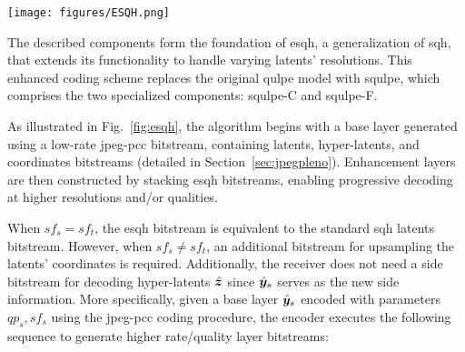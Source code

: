 \begin{figure*}
    \texttt{[image: figures/ESQH.png]}
    \caption{Scalable Resolution and Quality Hyperprior coding scheme. In red are the blocks that are relative to the encoding of the coordinates.}
    \label{fig:esqh}
\end{figure*}
The described components form the foundation of \gls{esqh}, a generalization of \gls{sqh}, that extends its functionality to handle varying latents' resolutions. This enhanced coding scheme replaces the original \gls{qulpe} model with \gls{squlpe}, which comprises the two specialized components: \gls{squlpe}-C and \gls{squlpe}-F.

As illustrated in Fig.~\ref{fig:esqh}, the algorithm begins with a base layer generated using a low-rate \gls{jpeg-pcc} bitstream, containing latents, hyper-latents, and coordinates bitstreams (detailed in Section~\ref{sec:jpegpleno}). Enhancement layers are then constructed by stacking \gls{esqh} bitstreams, enabling progressive decoding at higher resolutions and/or qualities. 

When $sf_s = sf_t$, the \gls{esqh} bitstream is equivalent to the standard \gls{sqh} latents bitstream. However, when $sf_s\neq sf_t$, an additional bitstream for upsampling the latents' coordinates is required. Additionally, the receiver does not need a side bitstream for decoding hyper-latents $\hat{\z}$ since $\hat{\y}_s$ serves as the new side information.
More specifically, given a base layer $\hat{\y}_{s}$ encoded with parameters $qp_s, sf_s$ using the \gls{jpeg-pcc} coding procedure, the encoder executes the following sequence to generate higher rate/quality layer bitstreams:

